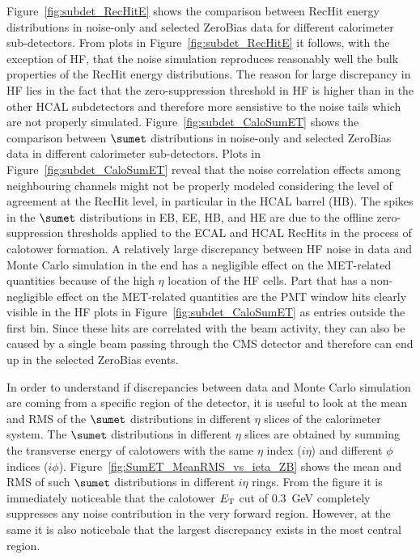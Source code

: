 Figure~\ref{fig:subdet_RecHitE} shows the comparison between RecHit energy distributions in noise-only and selected ZeroBias data for different
calorimeter sub-detectors. From plots in Figure~\ref{fig:subdet_RecHitE} it follows, with the exception of HF, that
the noise simulation reproduces reasonably well the bulk properties of the RecHit energy distributions. The reason for large discrepancy in HF lies 
in the fact that the zero-suppression threshold in HF is higher than in the other HCAL subdetectors and therefore more sensistive to the noise tails
which are not properly simulated. Figure~\ref{fig:subdet_CaloSumET} shows the comparison between $\sumet$ distributions in noise-only
and selected ZeroBias data in different calorimeter sub-detectors. Plots in Figure~\ref{fig:subdet_CaloSumET} reveal that the noise correlation
effects among neighbouring channels might not be properly modeled considering the level of agreement at the RecHit level, in particular in the
HCAL barrel (HB). The spikes in the $\sumet$ distributions in EB, EE, HB, and HE are due to the offline zero-suppression
thresholds applied to the ECAL and HCAL RecHits in the process of calotower formation. A relatively large discrepancy between HF noise in data and
Monte Carlo simulation in the end has a negligible effect on the MET-related quantities 
because of the high $\eta$ location of the HF cells. Part that has a non-negligible effect on the MET-related quantities are the PMT window hits
clearly visible in the HF plots in Figure~\ref{fig:subdet_CaloSumET} as entries outside the first bin. Since these
hits are correlated with the beam activity, they can also be caused by a single beam passing through the CMS detector and therefore can end up
in the selected ZeroBias events.

In order to understand if discrepancies between data and Monte Carlo simulation are coming from a specific region of the detector, it is useful to
look at the mean and RMS of the $\sumet$ distributions in different $\eta$ slices of the calorimeter system. The $\sumet$ distributions in different
$\eta$ slices are obtained
by summing the transverse energy of calotowers with the same $\eta$ index ($i\eta$) and different $\phi$ indices ($i\phi$).
Figure~\ref{fig:SumET_MeanRMS_vs_ieta_ZB} shows the mean and RMS of such $\sumet$ distributions in different $i\eta$ rings. From the figure it is
immediately noticeable that the calotower $E_{\rm T}$ cut of $0.3$~GeV completely suppresses any noise contribution in the very forward region.
However, at the same it is also noticebale that the largest discrepancy exists in the most central region.



